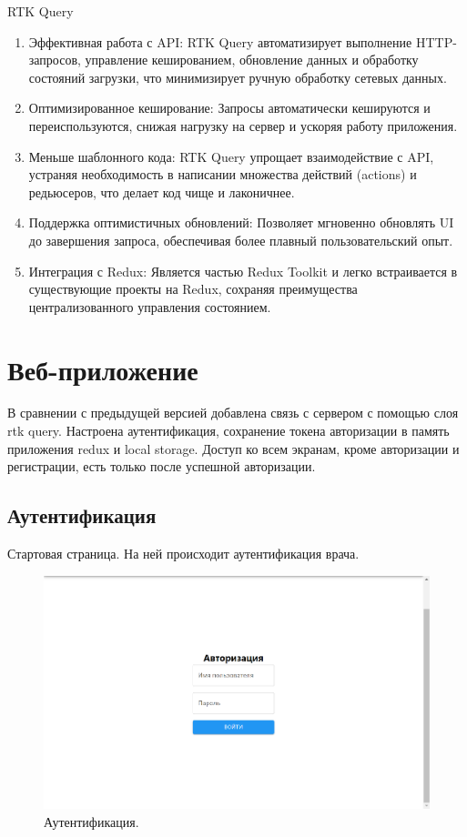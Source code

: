 \documentclass[a4paper,12pt]{article}
\begin{document}
    RTK Query
    \begin{enumerate}
        \item Эффективная работа с API: RTK Query автоматизирует выполнение HTTP-запросов, управление кешированием, обновление данных и обработку состояний загрузки, что минимизирует ручную обработку сетевых данных.
        \item Оптимизированное кеширование: Запросы автоматически кешируются и переиспользуются, снижая нагрузку на сервер и ускоряя работу приложения.

        \item Меньше шаблонного кода: RTK Query упрощает взаимодействие с API, устраняя необходимость в написании множества действий (actions) и редьюсеров, что делает код чище и лаконичнее.

        \item Поддержка оптимистичных обновлений: Позволяет мгновенно обновлять UI до завершения запроса, обеспечивая более плавный пользовательский опыт.

        \item Интеграция с Redux: Является частью Redux Toolkit и легко встраивается в существующие проекты на Redux, сохраняя преимущества централизованного управления состоянием.

    \end{enumerate}


    \newpage
    \section{Веб-приложение}\label{sec:-2}
    В сравнении с предыдущей версией добавлена связь с сервером с помощью слоя rtk query.
    Настроена аутентификация, сохранение токена авторизации в память приложения redux и local storage.
    Доступ ко всем экранам, кроме авторизации и регистрации, есть только после успешной авторизации.

    \subsection{Аутентификация}\label{subsec:}
    Стартовая страница.
    На ней происходит аутентификация врача.
    \begin{figure}[h]
        \includegraphics[scale=0.25]{images/screenshots/auth}
        \caption{Аутентификация.}\label{fig:figure4}
    \end{figure}
\end{document}
